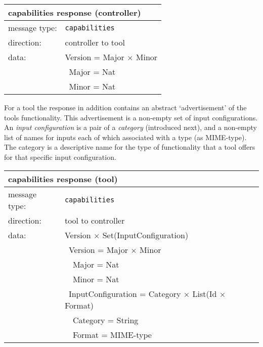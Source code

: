 \documentclass{article}
\newcommand{\msg}[1]{\texttt{#1}}
\begin{document}
   \begin{table}[H]
    \begin{center}
     \begin{tabular}{|ll|}
      \hline
       \multicolumn{2}{|l|}{\textbf{capabilities response (controller)}} \\
      \hline
       message type:   & \msg{capabilities} \\
      \hline
       direction:      & controller to tool \\
       data:           & Version = Major $\times$ Minor \\
                       & \ Major = Nat \\
                       & \ Minor = Nat \\
      \hline
     \end{tabular}
    \end{center}
    \vspace{-0.3cm}
   \end{table}

   \noindent For a tool the response in addition contains an abstract
   `advertisement' of the tools functionality. This advertisement is a
   non-empty set of input configurations.  An \textit{input configuration} is a
   pair of a \textit{category} (introduced next), and a non-empty list of names
   for inputs each of which associated with a type (as MIME-type).  The
   category is a descriptive name for the type of functionality that a tool
   offers for that specific input configuration.
   
   \begin{table}[H]
    \begin{center}
     \begin{tabular}{|ll|}
      \hline
       \multicolumn{2}{|l|}{\textbf{capabilities response (tool)}} \\
      \hline
       message type:   & \msg{capabilities} \\
      \hline
       direction:      & tool to controller \\
       data:           & Version $\times$ Set(InputConfiguration) \\
                       & \ Version = Major $\times$ Minor \\
                       & \ \ Major = Nat \\
                       & \ \ Minor = Nat \\
                       & \ InputConfiguration = Category $\times$ List(Id $\times$ Format) \\
                       & \ \ Category = String \\
                       & \ \ Format = MIME-type \\
      \hline
     \end{tabular}
    \end{center}
    \vspace{-0.3cm}
   \end{table}
\end{document}
